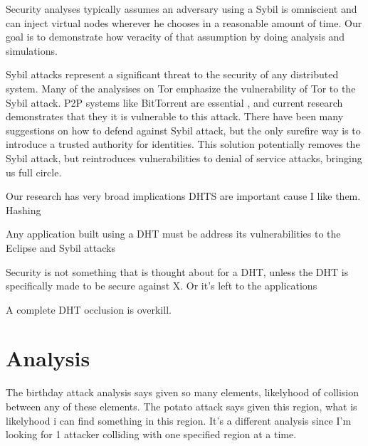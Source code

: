 \documentclass[10pt,a4paper]{article}
\begin{document}
Security analyses typically assumes an adversary using a Sybil is omniscient and can inject virtual nodes wherever he chooses in a reasonable amount of time. 
Our goal is to demonstrate how veracity of that assumption by doing analysis and simulations.

Sybil attacks represent a significant threat to the security of any distributed system.
Many of the analysises on Tor emphasize the vulnerability of Tor to the Sybil attack.
P2P systems like BitTorrent are essential , and current research demonstrates that they it is vulnerable to this attack.
There have been many suggestions on how to defend against Sybil attack, but the only surefire way is to introduce a trusted authority for identities.
This solution potentially removes the Sybil attack, but reintroduces vulnerabilities to denial of service attacks, bringing us full circle.




Our research has very broad implications 
DHTS are important cause I like them.
Hashing 

Any application built using a DHT must be address its vulnerabilities to the Eclipse and Sybil attacks

Security is not something that is thought about for a DHT, unless the 
DHT is specifically made to be secure against X.  
Or it's left to the applications


A complete DHT occlusion is overkill.



\section{Analysis}

\cite{bellare2004hash}

The birthday attack analysis says given so many elements, likelyhood of collision between any of these elements.
The potato attack says given this region, what is likelyhood i can find something in this region.  
It's a different analysis since I'm looking for 1 attacker colliding with one specified region at a time.
\end{document}
